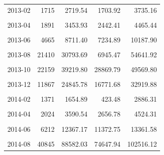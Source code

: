 \begin{longtable}[t]{crrrr}
2013-02 & 1715 & 2719.54 & 1703.92 & 3735.16\\
\cellcolor{gray!10}{2013-03} & \cellcolor{gray!10}{2283} & \cellcolor{gray!10}{3794.05} & \cellcolor{gray!10}{2329.63} & \cellcolor{gray!10}{5258.47}\\
2013-04 & 1891 & 3453.93 & 2442.41 & 4465.44\\
\cellcolor{gray!10}{2013-05} & \cellcolor{gray!10}{2844} & \cellcolor{gray!10}{5245.02} & \cellcolor{gray!10}{4489.82} & \cellcolor{gray!10}{6000.22}\\
2013-06 & 4665 & 8711.40 & 7234.89 & 10187.90\\
\cellcolor{gray!10}{2013-07} & \cellcolor{gray!10}{8794} & \cellcolor{gray!10}{18302.45} & \cellcolor{gray!10}{14237.60} & \cellcolor{gray!10}{22367.30}\\
2013-08 & 21410 & 30793.69 & 6945.47 & 54641.92\\
\cellcolor{gray!10}{2013-09} & \cellcolor{gray!10}{36019} & \cellcolor{gray!10}{63867.93} & \cellcolor{gray!10}{49802.45} & \cellcolor{gray!10}{77933.41}\\
2013-10 & 22159 & 39219.80 & 28869.79 & 49569.80\\
\cellcolor{gray!10}{2013-11} & \cellcolor{gray!10}{11954} & \cellcolor{gray!10}{7092.24} & \cellcolor{gray!10}{-2831.77} & \cellcolor{gray!10}{17016.25}\\
2013-12 & 11867 & 24845.78 & 16771.68 & 32919.88\\
\cellcolor{gray!10}{2014-01} & \cellcolor{gray!10}{3044} & \cellcolor{gray!10}{4639.70} & \cellcolor{gray!10}{3022.29} & \cellcolor{gray!10}{6257.11}\\
2014-02 & 1371 & 1654.89 & 423.48 & 2886.31\\
\cellcolor{gray!10}{2014-03} & \cellcolor{gray!10}{1929} & \cellcolor{gray!10}{2164.49} & \cellcolor{gray!10}{482.60} & \cellcolor{gray!10}{3846.38}\\
2014-04 & 2024 & 3590.54 & 2656.78 & 4524.31\\
\cellcolor{gray!10}{2014-05} & \cellcolor{gray!10}{2931} & \cellcolor{gray!10}{5413.19} & \cellcolor{gray!10}{4681.27} & \cellcolor{gray!10}{6145.11}\\
2014-06 & 6212 & 12367.17 & 11372.75 & 13361.58\\
\cellcolor{gray!10}{2014-07} & \cellcolor{gray!10}{10529} & \cellcolor{gray!10}{19479.49} & \cellcolor{gray!10}{16221.23} & \cellcolor{gray!10}{22737.75}\\
2014-08 & 40845 & 88582.03 & 74647.94 & 102516.12\\

\end{longtable}
